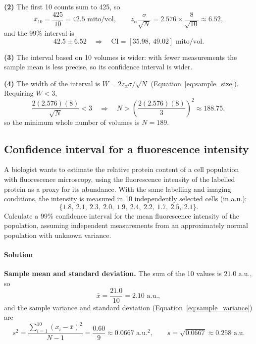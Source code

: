 \textbf{(2)} The first 10 counts sum to 425, so
\begin{equation*}
\bar{x}_{10} = \frac{425}{10} = 42.5\text{ mito/vol}, \qquad z_\alpha\frac{\sigma}{\sqrt{N}} = 2.576 \times \frac{8}{\sqrt{10}} \approx 6.52,
\end{equation*}
and the 99\% interval is
\begin{equation*}
42.5 \pm 6.52 \quad \Longrightarrow \quad \text{CI} = [35.98,\ 49.02]\text{ mito/vol}.
\end{equation*}

\textbf{(3)} The interval based on 10 volumes is wider: with fewer measurements the sample mean is less precise, so its confidence interval is wider.

\textbf{(4)} The width of the interval is $W = 2z_\alpha\sigma/\sqrt{N}$ (Equation~\eqref{eq:sample_size}). Requiring $W < 3$,
\begin{equation*}
\frac{2(2.576)(8)}{\sqrt{N}} < 3 \quad \Longrightarrow \quad N > \left(\frac{2(2.576)(8)}{3}\right)^2 \approx 188.75,
\end{equation*}
so the minimum whole number of volumes is $N = 189$.

\subsection{Confidence interval for a fluorescence intensity}
\label{ex:ci_fluorescence}

A biologist wants to estimate the relative protein content of a cell population with fluorescence microscopy, using the fluorescence intensity of the labelled protein as a proxy for its abundance. With the same labelling and imaging conditions, the intensity is measured in 10 independently selected cells (in a.u.):
\begin{equation*}
\{1.8,\ 2.1,\ 2.3,\ 2.0,\ 1.9,\ 2.4,\ 2.2,\ 1.7,\ 2.5,\ 2.1\}.
\end{equation*}
Calculate a 99\% confidence interval for the mean fluorescence intensity of the population, assuming independent measurements from an approximately normal population with unknown variance.

\paragraph{Solution} \textbf{Sample mean and standard deviation.} The sum of the 10 values is $21.0\text{ a.u.}$, so
\begin{equation*}
\bar{x} = \frac{21.0}{10} = 2.10\text{ a.u.},
\end{equation*}
and the sample variance and standard deviation (Equation~\eqref{eq:sample_variance}) are
\begin{equation*}
s^2 = \frac{\sum_{i=1}^{10}(x_i - \bar{x})^2}{N - 1} = \frac{0.60}{9} \approx 0.0667\text{ a.u.}^2, \qquad s = \sqrt{0.0667} \approx 0.258\text{ a.u.}
\end{equation*}

